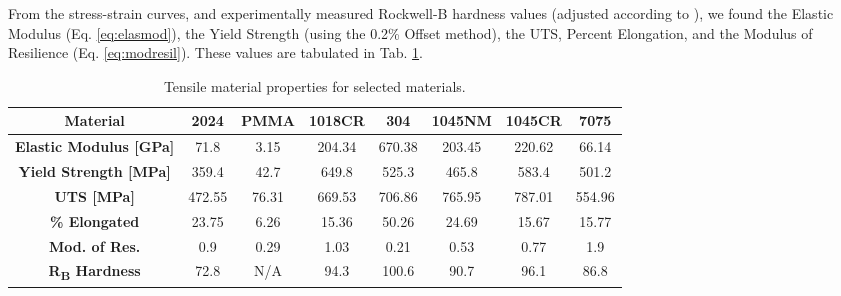 \documentclass{article}
\begin{document}
\newpage
From the stress-strain curves, and experimentally measured Rockwell-B hardness values (adjusted according to \cite{manual}), we found the Elastic Modulus (Eq. \ref{eq:elasmod}), the Yield Strength (using the 0.2\% Offset method), the UTS, Percent Elongation, and the Modulus of Resilience (Eq. \ref{eq:modresil}). These values are tabulated in Tab. \ref{tab:q2}.
\vspace{.5cm}
\begin{table}[!h!]
    \centering
    \def\arraystretch{1.5}
    \caption{Tensile material properties for selected materials.}
    \begin{tabular}{|c|c|c|c|c|c|c|c|}
         \toprule
         \hline
         \textbf{Material}& \textbf{2024} & \textbf{PMMA} & \textbf{1018CR} & \textbf{304} & \textbf{1045NM} &\textbf{1045CR} & \textbf{7075}\\
         \midrule
         \hline
         \textbf{Elastic Modulus [GPa]}& 71.8 & 3.15 & 204.34 & 670.38 & 203.45 & 220.62 & 66.14 \\
         \textbf{Yield Strength [MPa]} & 359.4 & 42.7 & 649.8 & 525.3 & 465.8 & 583.4 & 501.2 \\
         \textbf{UTS [MPa]} & 472.55 & 76.31 & 669.53 & 706.86 & 765.95 & 787.01 & 554.96 \\
         \textbf{\% Elongated} & 23.75 & 6.26 & 15.36 & 50.26 & 24.69 & 15.67 & 15.77 \\
         \textbf{Mod. of Res.} & 0.9 & 0.29 & 1.03 & 0.21 & 0.53 & 0.77 & 1.9\\
         \textbf{R\textsubscript{B} Hardness} & 72.8 & N/A & 94.3 & 100.6 & 90.7 & 96.1 & 86.8 \\
         \hline
    \end{tabular}
    \label{tab:q2}
\end{table}
\vspace{.5cm}
\end{document}
